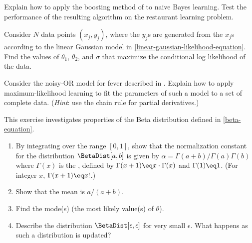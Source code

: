 
\begin{exercise}
Explain how to apply the boosting method of  to
naive Bayes learning. Test the performance of the resulting algorithm on the restaurant learning problem.
\end{exercise} 

\begin{exercise}
Consider \(N\) data points \((x_j,y_j)\), where the \(y_j\)s are generated
from the \(x_j\)s according to the linear Gaussian model in 
\eqref{linear-gaussian-likelihood-equation}. Find the values of
\(\theta_1\), \(\theta_2\), and \(\sigma\) that maximize the
conditional log likelihood of the data.
\end{exercise} 

\begin{exercise}
Consider the noisy-OR model for fever described in .
Explain how to apply maximum-likelihood learning to fit the parameters of such a model to 
a set of complete data. ({\em Hint}: use the chain rule for partial derivatives.)
\end{exercise} 

\begin{exercise}
This exercise investigates properties of the Beta distribution defined
in \eqref{beta-equation}.
\begin{enumerate}
\item By integrating over the range \([0,1]\), show that the normalization
constant for the distribution \(\BetaDist[a,b]\) is given by
\(\alpha = \Gamma(a+b)/\Gamma(a)\Gamma(b)\) where \(\Gamma(x)\) is the , defined by
\(\Gamma(x+1)\eq x\cdot\Gamma(x)\) and \(\Gamma(1)\eq 1\). (For integer
\(x\), \(\Gamma(x+1)\eq x!\).)
\item Show that the mean is \(a/(a+b)\).
\item Find the mode(s) (the most likely value(s) of \(\theta\)).
\item Describe the distribution \(\BetaDist[\epsilon,\epsilon]\) for
very small \(\epsilon\). What happens as such a distribution is updated?
\end{enumerate}
\end{exercise} 

